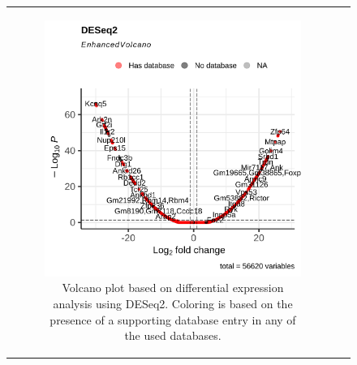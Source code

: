 \begin{figure}[H] \begin{tabular}{cc} \begin{subfigure}{0.5\textwidth}
                 \centering 

                 \includegraphics[width=\linewidth]{chapters/4_results_and_discussion/figures/dea/deseq2/esr1/volcano.png}
                 \caption{Volcano plot based on differential expression analysis using DESeq2.
                     Coloring is based on the presence of a supporting database entry in any of the
                     used databases.
                 } \label{fig:esr1_volcano} \end{subfigure}
        \begin{subfigure}{0.5\textwidth} \centering


\end{subfigure}
\end{tabular}
\end{figure}
